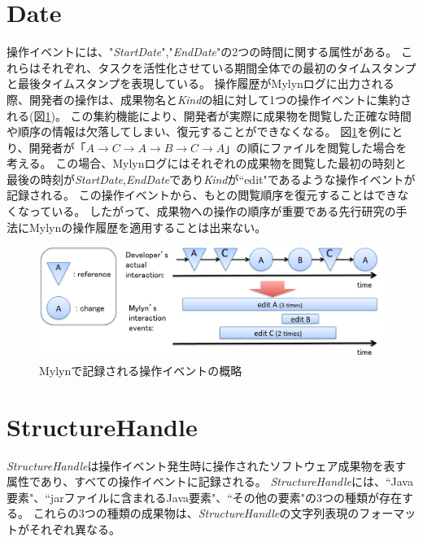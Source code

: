 \documentclass[a4paper]{jsbook}
\def\ra{\rightarrow}
\begin{document}
\section{Date}
操作イベントには、"{\it StartDate}","{\it EndDate}"の2つの時間に関する属性がある。
これらはそれぞれ、タスクを活性化させている期間全体での最初のタイムスタンプと最後タイムスタンプを表現している。
操作履歴がMylynログに出力される際、開発者の操作は、成果物名と{\it Kind}の組に対して1つの操作イベントに集約される(図\ref{mylyn_interaction})。
この集約機能により、開発者が実際に成果物を閲覧した正確な時間や順序の情報は欠落してしまい、復元することができなくなる。
図\ref{mylyn_interaction}を例にとり、開発者が「$A\ra C \ra A \ra B \ra C \ra A$」の順にファイルを閲覧した場合を考える。
この場合、Mylynログにはそれぞれの成果物を閲覧した最初の時刻と最後の時刻が{\it StartDate},{\it EndDate}であり{\it Kind}が``edit"であるような操作イベントが記録される。
この操作イベントから、もとの閲覧順序を復元することはできなくなっている。
したがって、成果物への操作の順序が重要である先行研究\cite{6233415,KatoJapanese:2011,ss2012-76,ss2013-84,Yamamori:2016}の手法にMylynの操作履歴を適用することは出来ない。
\begin{figure}[tb]
  \centering
  \includegraphics[width = \linewidth]{resource/mylyn_interaction.pdf}
  \caption{Mylynで記録される操作イベントの概略}
  \label{mylyn_interaction}
\end{figure}
\section{StructureHandle}
{\it StructureHandle}は操作イベント発生時に操作されたソフトウェア成果物を表す属性であり、すべての操作イベントに記録される。
{\it StructureHandle}には、``Java要素"、``jarファイルに含まれるJava要素"、``その他の要素"の3つの種類が存在する。
これらの3つの種類の成果物は、{\it StructureHandle}の文字列表現のフォーマットがそれぞれ異なる。
\end{document}
